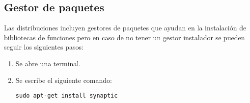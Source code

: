 \subsection{Gestor de paquetes}

Las distribuciones incluyen gestores de paquetes que ayudan en la instalación de bibliotecas de funciones
pero en caso de no tener un gestor instalador se pueden seguir los siguientes pasos:

\begin{enumerate}
\item Se abre una terminal.
\item Se escribe el siguiente comando:
\begin{verbatim}
sudo apt-get install synaptic
\end{verbatim}
\end{enumerate}


 
